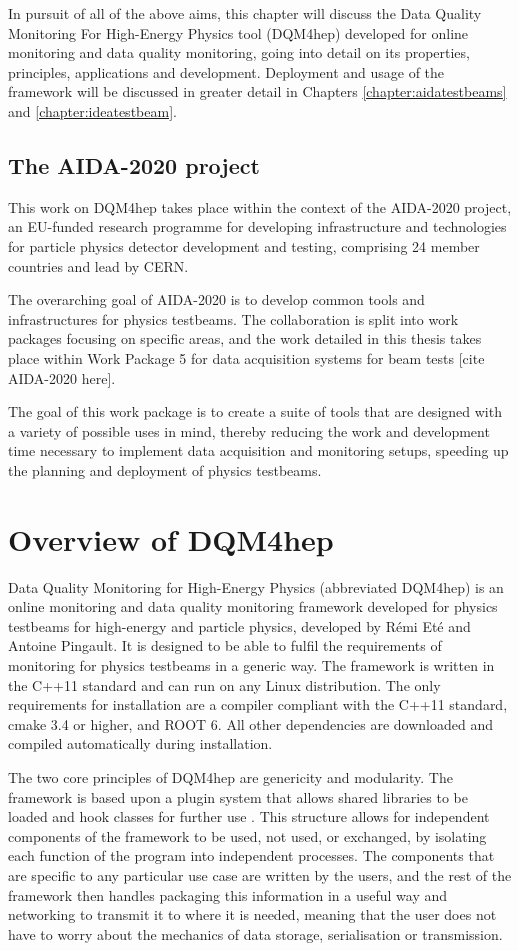 In pursuit of all of the above aims, this chapter will discuss the Data Quality Monitoring For High-Energy Physics tool (DQM4hep) developed for online monitoring and data quality monitoring, going into detail on its properties, principles, applications and development. Deployment and usage of the framework will be discussed in greater detail in Chapters \ref{chapter:aidatestbeams} and \ref{chapter:ideatestbeam}.

\subsection*{The AIDA-2020 project}
This work on DQM4hep takes place within the context of the AIDA-2020 project, an EU-funded research programme for developing infrastructure and technologies for particle physics detector development and testing, comprising 24 member countries and lead by CERN.

The overarching goal of AIDA-2020 is to develop common tools and infrastructures for physics testbeams. The collaboration is split into work packages focusing on specific areas, and the work detailed in this thesis takes place within Work Package 5 for data acquisition systems for beam tests [cite AIDA-2020 here]. 

The goal of this work package is to create a suite of tools that are designed with a variety of possible uses in mind, thereby reducing the work and development time necessary to implement data acquisition and monitoring setups, speeding up the planning and deployment of physics testbeams. 

\section{Overview of DQM4hep}
Data Quality Monitoring for High-Energy Physics (abbreviated DQM4hep) is an online monitoring and data quality monitoring framework developed for physics testbeams for high-energy and particle physics, developed by R\'{e}mi Et\'{e} and Antoine Pingault. It is designed to be able to fulfil the requirements of monitoring for physics testbeams in a generic way. The framework is written in the C++11 standard and can run on any Linux distribution. The only requirements for installation are a compiler compliant with the C++11 standard, cmake 3.4 or higher, and ROOT 6. All other dependencies are downloaded and compiled automatically during installation. 

The two core principles of DQM4hep are genericity and modularity. The framework is based upon a plugin system that allows shared libraries to be loaded and hook classes for further use \cite{aida2020-milestone-dqm4hep}. This structure allows for independent components of the framework to be used, not used, or exchanged, by isolating each function of the program into independent processes. The components that are specific to any particular use case are written by the users, and the rest of the framework then handles packaging this information in a useful way and networking to transmit it to where it is needed, meaning that the user does not have to worry about the mechanics of data storage, serialisation or transmission. 

